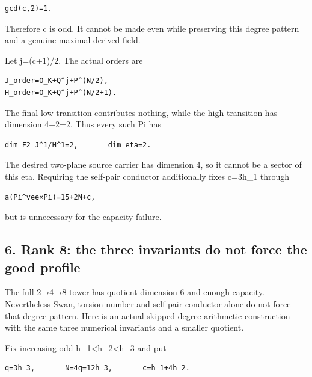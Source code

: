 \begin{Verbatim}[fontsize=\small,breaklines=true,breakanywhere=true]
gcd(c,2)=1.
\end{Verbatim}

Therefore c is odd. It cannot be made even while preserving this degree
pattern and a genuine maximal derived field.

Let j=(c+1)/2. The actual orders are

\begin{Verbatim}[fontsize=\small,breaklines=true,breakanywhere=true]
J_order=O_K+Q^j+P^(N/2),
H_order=O_K+Q^j+P^(N/2+1).
\end{Verbatim}

The final low transition contributes nothing, while the high transition
has dimension 4−2=2. Thus every such Pi has

\begin{Verbatim}[fontsize=\small,breaklines=true,breakanywhere=true]
dim_F2 J^1/H^1=2,       dim eta=2.
\end{Verbatim}

The desired two-plane source carrier has dimension 4, so it cannot be a
sector of this eta. Requiring the self-pair conductor additionally fixes
c=3h\_1 through

\begin{Verbatim}[fontsize=\small,breaklines=true,breakanywhere=true]
a(Pi^vee×Pi)=15+2N+c,
\end{Verbatim}

but is unnecessary for the capacity failure.

\hypertarget{dyadic_capacity-rank8-the-three-invariants-do-not-force-the-good-profile}{%
\subsection{6. Rank 8: the three invariants do not force the good
profile}\label{dyadic_capacity-rank8-the-three-invariants-do-not-force-the-good-profile}}

The full 2→4→8 tower has quotient dimension 6 and enough capacity.
Nevertheless Swan, torsion number and self-pair conductor alone do not
force that degree pattern. Here is an actual skipped-degree arithmetic
construction with the same three numerical invariants and a smaller
quotient.

Fix increasing odd h\_1\textless h\_2\textless h\_3 and put

\begin{Verbatim}[fontsize=\small,breaklines=true,breakanywhere=true]
q=3h_3,       N=4q=12h_3,       c=h_1+4h_2.
\end{Verbatim}

